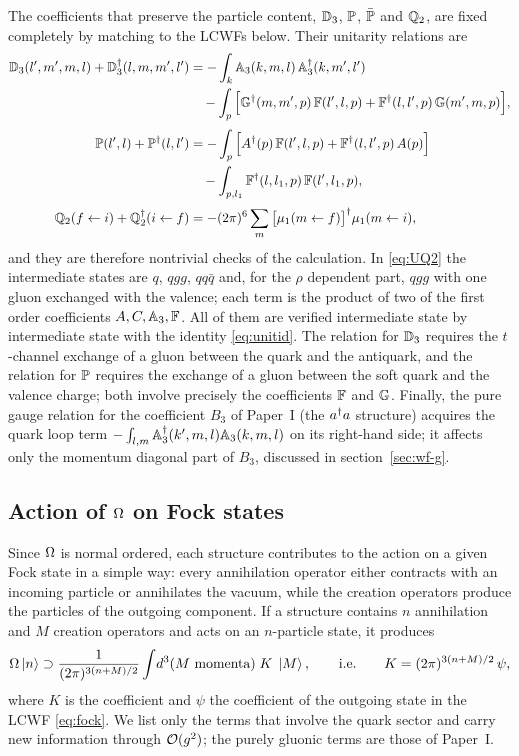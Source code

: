 The coefficients that preserve the particle content, $\mathbb{D}_{3}$, $\mathbb{P}$, $\bar{\mathbb{P}}$ and
$\mathbb{Q}_{2}$, are fixed completely by matching to the LCWFs below. Their unitarity relations are
\begin{align}
\mathbb{D}_{3}(l',m',m,l)+\mathbb{D}_{3}^{\dagger}(l,m,m',l')&=
-\int_{k}\mathbb{A}_{3}(k,m,l)\,\mathbb{A}_{3}^{\dagger}(k,m',l')
\nonumber\\
&\quad-\int_{p}\Big[\mathbb{G}^{\dagger}(m,m',p)\,\mathbb{F}(l',l,p)+\mathbb{F}^{\dagger}(l,l',p)\,\mathbb{G}(m',m,p)\Big],
\label{eq:UD3}\\[3pt]
\mathbb{P}(l',l)+\mathbb{P}^{\dagger}(l,l')&=-\int_{p}\Big[A^{\dagger}(p)\,\mathbb{F}(l',l,p)+\mathbb{F}^{\dagger}(l,l',p)\,A(p)\Big]
\nonumber\\
&\quad-\int_{p,l_{1}}\mathbb{F}^{\dagger}(l,l_{1},p)\,\mathbb{F}(l',l_{1},p),
\label{eq:UP}\\[3pt]
\mathbb{Q}_{2}(f\leftarrow i)+\mathbb{Q}_{2}^{\dagger}(i\leftarrow f)&=-(2\pi)^{6}\sum_{m}\big[\mu_{1}(m\leftarrow f)\big]^{\dagger}\mu_{1}(m\leftarrow i),
\label{eq:UQ2}
\end{align}
and they are therefore nontrivial checks of the calculation. In \eqref{eq:UQ2} the intermediate
states are $q$, $qgg$, $qq\bar q$ and, for the $\rho$ dependent part, $qgg$ with one gluon
exchanged with the valence; each term is the product of two of the first order coefficients
$A,C,\mathbb{A}_{3},\mathbb{F}$. All of them are verified intermediate state by intermediate state with the
identity \eqref{eq:unitid}. The relation for $\mathbb{D}_{3}$ requires the $t$-channel exchange of a
gluon between the quark and the antiquark, and the relation for $\mathbb{P}$ requires the exchange of a
gluon between the soft quark and the valence charge; both involve precisely the coefficients
$\mathbb{F}$ and $\mathbb{G}$. Finally, the pure gauge relation for the coefficient $B_{3}$ of Paper~I (the $a^{\dagger}a$
structure) acquires the quark loop term $-\int_{l,m}\mathbb{A}_{3}^{\dagger}(k',m,l)\mathbb{A}_{3}(k,m,l)$ on its
right-hand side; it affects only the momentum diagonal part of $B_{3}$, discussed in
section~\ref{sec:wf-g}.

\subsection*{Action of $\Omega$ on Fock states}
\label{sec:action}

Since $\Omega$ is normal ordered, each structure contributes to the action on a given Fock state in
a simple way: every annihilation operator either contracts with an incoming particle or
annihilates the vacuum, while the creation operators produce the particles of the outgoing
component. If a structure contains $n$ annihilation and $M$ creation operators and acts on an
$n$-particle state, it produces
\begin{equation}
\OM\ket{n}\supset\frac{1}{(2\pi)^{3(n+M)/2}}\int\!d^{3}(M\ \text{momenta})\;K\;\ket{M},
\qquad\text{i.e.}\qquad K=(2\pi)^{3(n+M)/2}\,\psi,
\label{eq:rule}
\end{equation}
where $K$ is the coefficient and $\psi$ the coefficient of the outgoing state in the LCWF
\eqref{eq:fock}. We list only the terms that involve the quark sector and carry new information
through $\mathcal{O}(g^{2})$; the purely gluonic terms are those of Paper~I.

